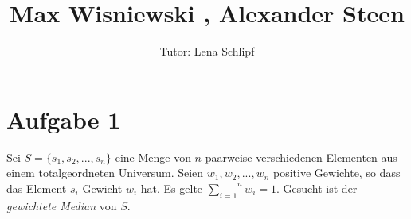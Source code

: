 \documentclass[11pt,a4paper,ngerman]{article}
\author{Tutor: Lena Schlipf}
\date{}
\title{Max Wisniewski , Alexander Steen}
\begin{document}

\maketitle
\thispagestyle{fancy}


\section*{Aufgabe 1}

Sei $S = \{ s_1, s_2, ..., s_n \} $ eine Menge von $n$ paarweise verschiedenen Elementen aus einem totalgeordneten Universum. Seien $w_1, w_2, ..., w_n$ positive Gewichte, so dass das Element $s_i$ Gewicht $w_i$ hat. Es gelte $\overset{n}{\underset{i=1}{\sum}} w_i = 1$. Gesucht ist der \emph{gewichtete Median} von $S$.
\end{document}

